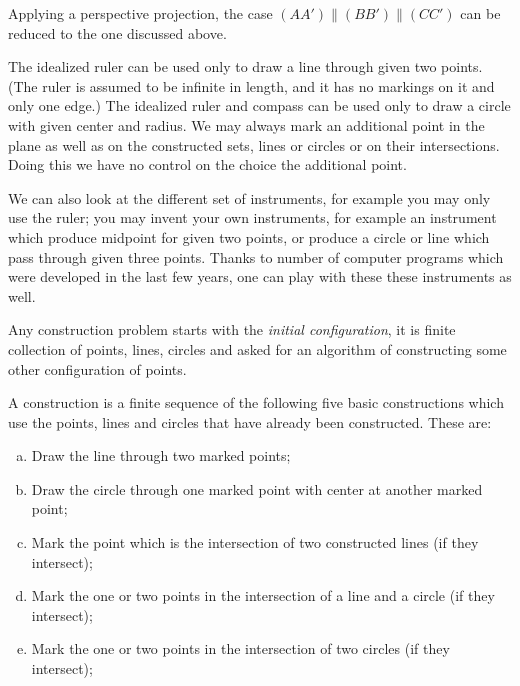 Applying a perspective projection,
the case $(AA')\parallel(BB')\parallel(CC')$ 
can be reduced to the one discussed above.
\qeds

















The idealized ruler can be used only to draw a line through given two points. (The ruler is assumed to be infinite in length, and it has no markings on it and only one edge.)
The idealized ruler and compass can be used only to draw a circle with given center and radius.
We may always mark an additional point in the plane
as well as on the constructed sets, lines or circles or on their intersections.
Doing this we have no control on the choice the additional point. 

We can also look at the different set of instruments, 
for example
you may only use the ruler;
you may invent your own instruments, for example an instrument which produce midpoint for given two points, 
or produce a circle or line which pass through given three points.
Thanks to number of computer programs which were developed in the last few years, one can play with these these instruments as well.

Any construction problem starts with the \emph{initial configuration},
it is finite collection of points, lines, circles
and asked for an algorithm of constructing some other configuration of points.

A construction is a finite sequence of the following five basic constructions which use the points, lines and circles that have already been constructed. 
These are:
\begin{enumerate}[(a)]
\item Draw the line through two marked points;
\item Draw the circle through one marked point with center at another marked point;
\item Mark the point which is the intersection of two constructed lines (if they intersect);
\item Mark the one or two points in the intersection of a line and a circle (if they intersect);
\item Mark the one or two points in the intersection of two circles (if they intersect);
\end{enumerate}


